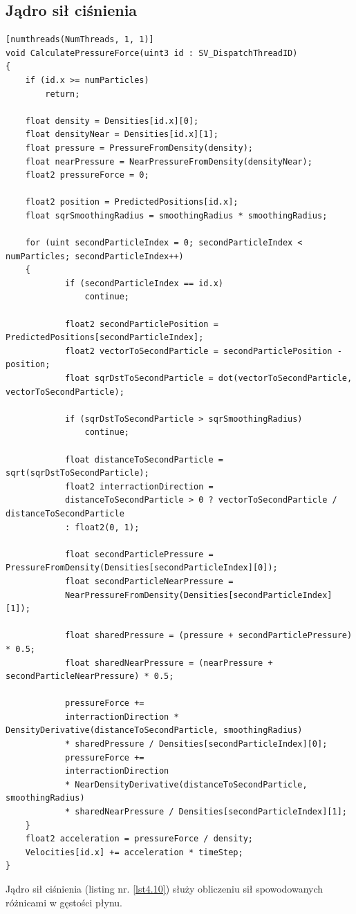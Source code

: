 \documentclass{article}
\begin{document}
\subsection{Jądro sił ciśnienia}
\begin{lstlisting}[caption=Jądro sił ciśnienia, label={lst4.10}]
[numthreads(NumThreads, 1, 1)]
void CalculatePressureForce(uint3 id : SV_DispatchThreadID)
{
	if (id.x >= numParticles)
		return;

	float density = Densities[id.x][0];
	float densityNear = Densities[id.x][1];
	float pressure = PressureFromDensity(density);
	float nearPressure = NearPressureFromDensity(densityNear);
	float2 pressureForce = 0;
	
	float2 position = PredictedPositions[id.x];
	float sqrSmoothingRadius = smoothingRadius * smoothingRadius;

	for (uint secondParticleIndex = 0; secondParticleIndex < numParticles; secondParticleIndex++)
	{
			if (secondParticleIndex == id.x)
				continue;

			float2 secondParticlePosition = PredictedPositions[secondParticleIndex];
			float2 vectorToSecondParticle = secondParticlePosition - position;
			float sqrDstToSecondParticle = dot(vectorToSecondParticle, vectorToSecondParticle);

			if (sqrDstToSecondParticle > sqrSmoothingRadius)
				continue;

			float distanceToSecondParticle = sqrt(sqrDstToSecondParticle);
			float2 interractionDirection = 
            distanceToSecondParticle > 0 ? vectorToSecondParticle / distanceToSecondParticle 
            : float2(0, 1);

			float secondParticlePressure = PressureFromDensity(Densities[secondParticleIndex][0]);
			float secondParticleNearPressure = 
            NearPressureFromDensity(Densities[secondParticleIndex][1]);

			float sharedPressure = (pressure + secondParticlePressure) * 0.5;
			float sharedNearPressure = (nearPressure + secondParticleNearPressure) * 0.5;

			pressureForce += 
            interractionDirection * DensityDerivative(distanceToSecondParticle, smoothingRadius) 
            * sharedPressure / Densities[secondParticleIndex][0];
			pressureForce += 
            interractionDirection 
            * NearDensityDerivative(distanceToSecondParticle, smoothingRadius) 
            * sharedNearPressure / Densities[secondParticleIndex][1];
	}
	float2 acceleration = pressureForce / density;
	Velocities[id.x] += acceleration * timeStep;
}
\end{lstlisting}
\noindent
Jądro sił ciśnienia (listing nr. \ref{lst4.10}) służy obliczeniu sił spowodowanych różnicami w gęstości płynu.\newline
\newpage
\end{document}
